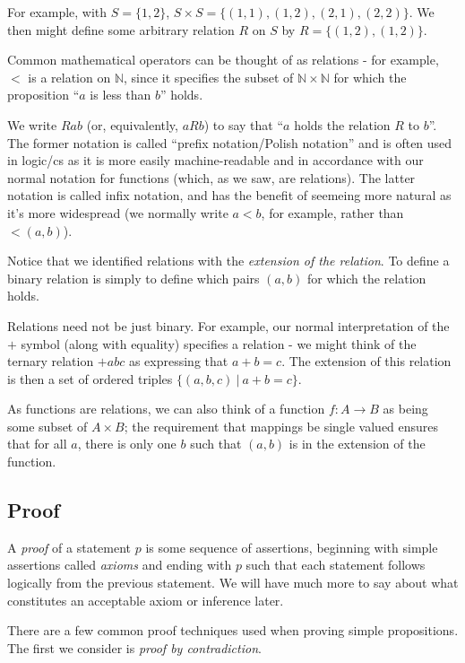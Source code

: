 \documentclass[12pt]{article}
\begin{document}
For example, with $S = \{1, 2\}$, $S \times S = \{(1, 1), (1, 2), (2, 1), (2, 2)\}$. We then might define some arbitrary relation $R$ on $S$ by $R = \{(1, 2), (1, 2)\}$.

Common mathematical operators can be thought of as relations - for example, $<$ is a relation on $\mathbb{N}$, since it specifies the subset of $\mathbb{N} \times \mathbb{N}$ for which the proposition ``$a$ is less than $b$'' holds.

We write $Rab$ (or, equivalently, $aRb$) to say that ``$a$ holds the relation $R$ to $b$''. The former notation is called ``prefix notation/Polish notation'' and is often used in logic/cs as it is more easily machine-readable and in accordance with our normal notation for functions (which, as we saw, are relations). The latter notation is called infix notation, and has the benefit of seemeing more natural as it's more widespread (we normally write $a < b$, for example, rather than ${<}(a, b)$). 

Notice that we identified relations with the \emph{extension of the relation}. To define a binary relation is simply to define which pairs $(a, b)$ for which the relation holds. 

Relations need not be just binary. For example, our normal interpretation of the $+$ symbol (along with equality) specifies a relation - we might think of the ternary relation $+abc$ as expressing that $a + b = c$. The extension of this relation is then a set of ordered triples $\{(a, b, c)\ |\ a + b = c\}$. 

As functions are relations, we can also think of a function $f: A \rightarrow B$ as being some subset of $A \times B$; the requirement that mappings be single valued ensures that for all $a$, there is only one $b$ such that $(a, b)$ is in the extension of the function. 

\subsection{Proof}
A \emph{proof} of a statement $p$ is some sequence of assertions, beginning with simple assertions called \emph{axioms} and ending with $p$ such that each statement follows logically from the previous statement. We will have much more to say about what constitutes an acceptable axiom or inference later. 

There are a few common proof techniques used when proving simple propositions. The first we consider is \emph{proof by contradiction}. 
\end{document}
